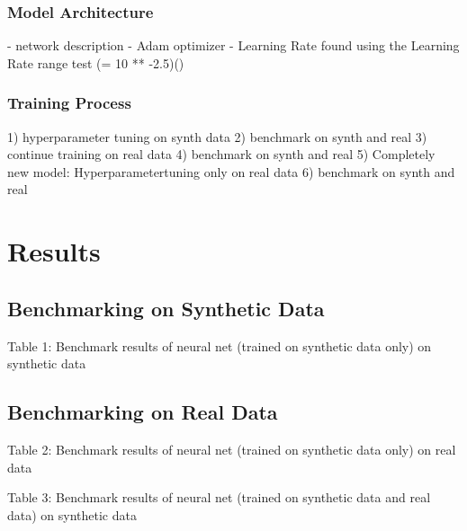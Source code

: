 \documentclass[11pt]{article}
\begin{document}
\subsubsection{Model Architecture}
- network description
- Adam optimizer
- Learning Rate found using the Learning Rate range test (= 10 ** -2.5)(\cite{smith2018disciplined})


	
 	

\subsubsection{Training Process}
1) hyperparameter tuning on synth data
2) benchmark on synth and real
3) continue training on real data
4) benchmark on synth and real
5) Completely new model: Hyperparametertuning only on real data
6) benchmark on synth and real

\section{Results}
\subsection{Benchmarking on Synthetic Data}

\begin{center}
	
\end{center}
Table 1: Benchmark results of neural net (trained on synthetic data only) on synthetic data


\subsection{Benchmarking on Real Data}

\begin{center}

\end{center}
Table 2: Benchmark results of neural net (trained on synthetic data only) on real data



\begin{center}

\end{center}
Table 3: Benchmark results of neural net (trained on synthetic data and real data) on synthetic data
\end{document}
